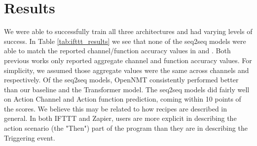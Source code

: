 \documentclass[letterpaper]{article} %
\begin{document}
\vspace{-2.67mm}
\section{Results}

We were able to successfully train all three architectures and had varying levels of success. In Table \ref{tab:ifttt_results} we see that none of the seq2seq models were able to match the reported channel/function accuracy values in \citeauthor{chen2016latent} \citeyear{chen2016latent} and \citeauthor{beltagy-quirk-2016-improved} \citeyear{beltagy-quirk-2016-improved}. Both previous works only reported aggregate channel and function accuracy values. For simplicity, we assumed those aggregate values were the same across channels and  respectively. Of the seq2seq models, OpenNMT consistently performed better than our baseline and the Transformer model. The seq2seq models did fairly well on Action Channel and Action function prediction, coming within 10 points of the \citeauthor{chen2016latent} \citeyear{chen2016latent} scores. We believe this may be related to how recipes are described in general. In both IFTTT and Zapier, users are more explicit in describing the action scenario (the "Then") part of the program than they are in describing the Triggering event.
\end{document}
